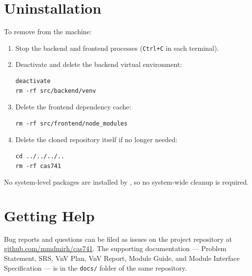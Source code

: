 \documentclass{article}
\begin{document}
\section{Uninstallation}

To remove \progname{} from the machine:

\begin{enumerate}
  \item Stop the backend and frontend processes
    (\texttt{Ctrl+C} in each terminal).
  \item Deactivate and delete the backend virtual environment:
    \begin{verbatim}
deactivate
rm -rf src/backend/venv
    \end{verbatim}
  \item Delete the frontend dependency cache:
    \begin{verbatim}
rm -rf src/frontend/node_modules
    \end{verbatim}
  \item Delete the cloned repository itself if no longer needed:
    \begin{verbatim}
cd ../../../..
rm -rf cas741
    \end{verbatim}
\end{enumerate}

No system-level packages are installed by \progname{}, so no
system-wide cleanup is required.

\section{Getting Help}

Bug reports and questions can be filed as issues on the project
repository at
\href{https://github.com/mmdmirh/cas741}{github.com/mmdmirh/cas741}.
The supporting documentation --- Problem Statement, SRS, VnV Plan,
VnV Report, Module Guide, and Module Interface Specification --- is
in the \texttt{docs/} folder of the same repository.
\end{document}
